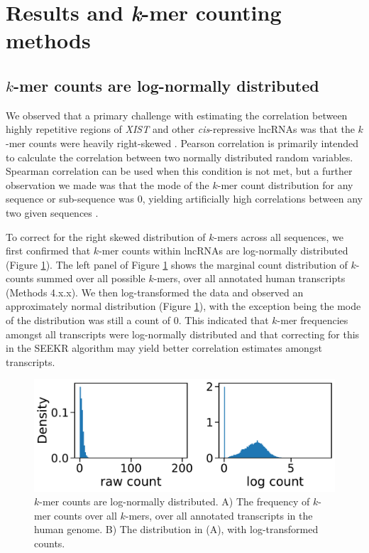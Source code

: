\section{Results and \textit{k}-mer counting methods} 

\subsection{$k$-mer counts are log-normally distributed}

We observed that a primary challenge with estimating the correlation between highly repetitive regions of \emph{XIST} and other \emph{cis}-repressive lncRNAs was that the $k$-mer counts were heavily right-skewed \cite{Sprague2019NonlinearDomains}. Pearson correlation is primarily intended to calculate the correlation between two normally distributed random variables. Spearman correlation can be used when this condition is not met, but a further observation we made was that the mode of the $k$-mer count distribution for any sequence or sub-sequence was 0, yielding artificially high correlations between any two given sequences \cite{Sprague2019NonlinearDomains}. 

To correct for the right skewed distribution of $k$-mers across all sequences, we first confirmed that $k$-mer counts within lncRNAs are log-normally distributed (Figure \ref{fig:logdist}). The left panel of Figure \ref{fig:logdist} shows the marginal count distribution of $k$-counts summed over all possible $k$-mers, over all annotated human transcripts (Methods 4.x.x). We then log-transformed the data and observed an approximately normal distribution (Figure \ref{fig:logdist}), with the exception being the mode of the distribution was still a count of 0. This indicated that $k$-mer frequencies amongst all transcripts were log-normally distributed and that correcting for this in the SEEKR algorithm may yield better correlation estimates amongst transcripts. 
\begin{figure}[h!]
\centering
\includegraphics[width=\textwidth]{images/kmers_log_dist.pdf}
\caption[$k$-mers are log-normally distributed within sequences]{$k$-mer counts are log-normally distributed. A) The frequency of $k$-mer counts over all $k$-mers, over all annotated transcripts in the human genome. B) The distribution in (A), with log-transformed counts.}
\label{fig:logdist}
\end{figure}

